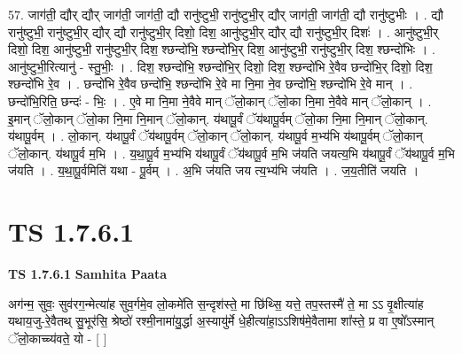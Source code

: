 \documentclass[17pt]{extarticle}
\begin{document}
57. जाग॑ती॒ द्यौर् द्यौर् जाग॑ती॒ जाग॑ती॒ द्यौ रानु॑ष्टुभी॒ रानु॑ष्टुभी॒र् द्यौर् जाग॑ती॒ जाग॑ती॒ द्यौ रानु॑ष्टुभीः । . द्यौ रानु॑ष्टुभी॒ रानु॑ष्टुभी॒र् द्यौर् द्यौ रानु॑ष्टुभी॒र् दिशो॒ दिश॒ आनु॑ष्टुभी॒र् द्यौर् द्यौ रानु॑ष्टुभी॒र् दिशः॑ । . आनु॑ष्टुभी॒र् दिशो॒ दिश॒ आनु॑ष्टुभी॒ रानु॑ष्टुभी॒र् दिश॒ श्छन्दो॑भि॒ श्छन्दो॑भि॒र् दिश॒ आनु॑ष्टुभी॒ रानु॑ष्टुभी॒र् दिश॒ श्छन्दो॑भिः । . आनु॑ष्टुभी॒रित्यानु॑ - स्तु॒भीः॒ । . दिश॒ श्छन्दो॑भि॒ श्छन्दो॑भि॒र् दिशो॒ दिश॒ श्छन्दो॑भि रे॒वैव छन्दो॑भि॒र् दिशो॒ दिश॒ श्छन्दो॑भि रे॒व । . छन्दो॑भि रे॒वैव छन्दो॑भि॒ श्छन्दो॑भि रे॒वे मा नि॒मा ने॒व छन्दो॑भि॒ श्छन्दो॑भि रे॒वे मान् । . छन्दो॑भि॒रिति॒ छन्दः॑ - भिः॒ । . ए॒वे मा नि॒मा ने॒वैवे मान् ॅलो॒कान् ॅलो॒का नि॒मा ने॒वैवे मान् ॅलो॒कान् । . इ॒मान् ॅलो॒कान् ॅलो॒का नि॒मा नि॒मान् ॅलो॒कान्. य॑थापू॒र्वं ॅय॑थापू॒र्वम् ॅलो॒का नि॒मा नि॒मान् ॅलो॒कान्. य॑थापू॒र्वम् । . लो॒कान्. य॑थापू॒र्वं ॅय॑थापू॒र्वम् ॅलो॒कान् ॅलो॒कान्. य॑थापू॒र्व म॒भ्य॑भि य॑थापू॒र्वम् ॅलो॒कान् 
ॅलो॒कान्. य॑थापू॒र्व म॒भि । . य॒था॒पू॒र्व म॒भ्य॑भि य॑थापू॒र्वं ॅय॑थापू॒र्व म॒भि ज॑यति जयत्य॒भि य॑थापू॒र्वं ॅय॑थापू॒र्व म॒भि ज॑यति । . य॒था॒पू॒र्वमिति॑ यथा - पू॒र्वम् । . अ॒भि ज॑यति जय त्य॒भ्य॑भि ज॑यति । . ज॒य॒तीति॑ जयति । \newline
\pagebreak
{}

\section{ TS 1.7.6.1 }

\textbf{TS 1.7.6.1 } \newline
\textbf{Samhita Paata} \newline

अग॑न्म॒ सुवः॒ सुव॑रग॒न्मेत्या॑ह सुव॒र्गमे॒व लो॒कमे॑ति स॒न्दृश॑स्ते॒ मा छि॑थ्सि॒ यत्ते॒ तप॒स्तस्मै॑ ते॒ मा ऽऽ वृ॒क्षीत्या॑ह यथाय॒जु-रे॒वैतथ् सु॒भूर॑सि॒ श्रेष्ठो॑ रश्मी॒नामा॑यु॒र्द्धा अ॒स्यायु॑र्मे धे॒हीत्या॑हा॒ऽऽशिष॑मे॒वैतामा शा᳚स्ते॒ प्र वा ए॒षो᳚ऽस्मान् ॅलो॒काच्च्य॑वते॒ यो - [ ] \newline
\end{document}
